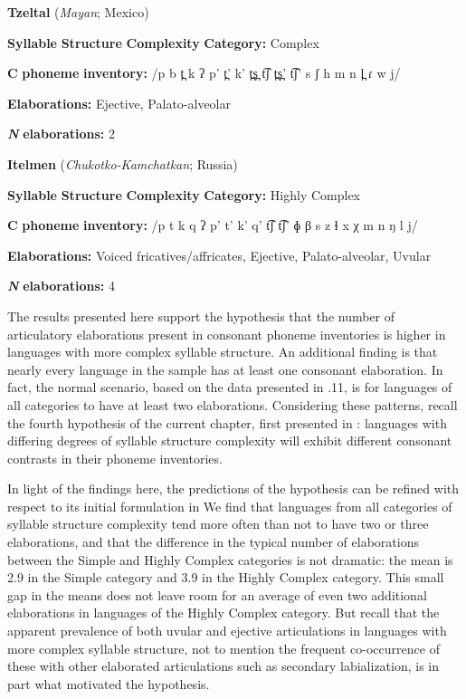 \ea\label{ex:(4.30)}
  \textbf{Tzeltal} (\textit{Mayan}; Mexico)

\textbf{Syllable} \textbf{Structure} \textbf{Complexity} \textbf{Category:} Complex

\textbf{C} \textbf{phoneme} \textbf{inventory:} /p b t̪ k ʔ p’ t̪’ k’ t̪s̪ t͡ʃ t̪s̪’ t͡ʃ’ s ʃ h m n l̪ ɾ w j/ 

\textbf{Elaborations:} Ejective, Palato-alveolar

\textbf{\textit{N}} \textbf{elaborations:} 2

\z

\ea\label{ex:(4.31)}
  \textbf{Itelmen} (\textit{Chukotko-Kamchatkan}; Russia)

\textbf{Syllable} \textbf{Structure} \textbf{Complexity} \textbf{Category:} Highly Complex

\textbf{C} \textbf{phoneme} \textbf{inventory:} /p t k q ʔ p’ t’ k’ q’ t͡ʃ t͡ʃ’ ɸ β s z ɬ x χ m n ŋ l j/

\textbf{Elaborations:} Voiced fricatives/affricates, Ejective, Palato-alveolar, Uvular 

\textbf{\textit{N}} \textbf{elaborations:} 4

\z

  The results presented here support the hypothesis that the number of articulatory elaborations present in consonant phoneme inventories is higher in languages with more complex syllable structure. An additional finding is that nearly every language in the sample has at least one consonant elaboration. In fact, the normal scenario, based on the data presented in .11, is for languages of all categories to have at least two elaborations. Considering these patterns, recall the fourth hypothesis of the current chapter, first presented in : languages with differing degrees of syllable structure complexity will exhibit different consonant contrasts in their phoneme inventories.

  In light of the findings here, the predictions of the hypothesis can be refined with respect to its initial formulation in  We find that languages from all categories of syllable structure complexity tend more often than not to have two or three elaborations, and that the difference in the typical number of elaborations between the Simple and Highly Complex categories is not dramatic: the mean is 2.9 in the Simple category and 3.9 in the Highly Complex category. This small gap in the means does not leave room for an average of even two additional elaborations in languages of the Highly Complex category. But recall that the apparent prevalence of both uvular and ejective articulations in languages with more complex syllable structure, not to mention the frequent co-occurrence of these with other elaborated articulations such as secondary labialization, is in part what motivated the hypothesis.

